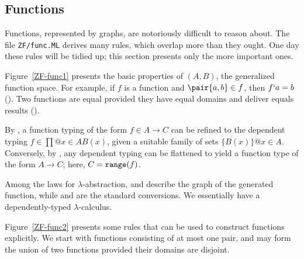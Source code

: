 \subsection{Functions}
Functions, represented by graphs, are notoriously difficult to reason
about.  The file {\tt ZF/func.ML} derives many rules, which overlap
more than they ought.  One day these rules will be tidied up; this section
presents only the more important ones.

Figure~\ref{ZF-func1} presents the basic properties of $(A,B)$,
the generalized function space.  For example, if $f$ is a function and
$\pair{a,b}\in f$, then $f`a=b$ ().  Two functions
are equal provided they have equal domains and deliver equals results
().

By , a function typing of the form $f\in A\to C$ can be
refined to the dependent typing $f\in\prod@{x\in A}B(x)$, given a suitable
family of sets $\{B(x)\}@{x\in A}$.  Conversely, by ,
any dependent typing can be flattened to yield a function type of the form
$A\to C$; here, $C={\tt range}(f)$.

Among the laws for $\lambda$-abstraction,  and 
describe the graph of the generated function, while  and
 are the standard conversions.  We essentially have a
dependently-typed $\lambda$-calculus.

Figure~\ref{ZF-func2} presents some rules that can be used to construct
functions explicitly.  We start with functions consisting of at most one
pair, and may form the union of two functions provided their domains are
disjoint.  


